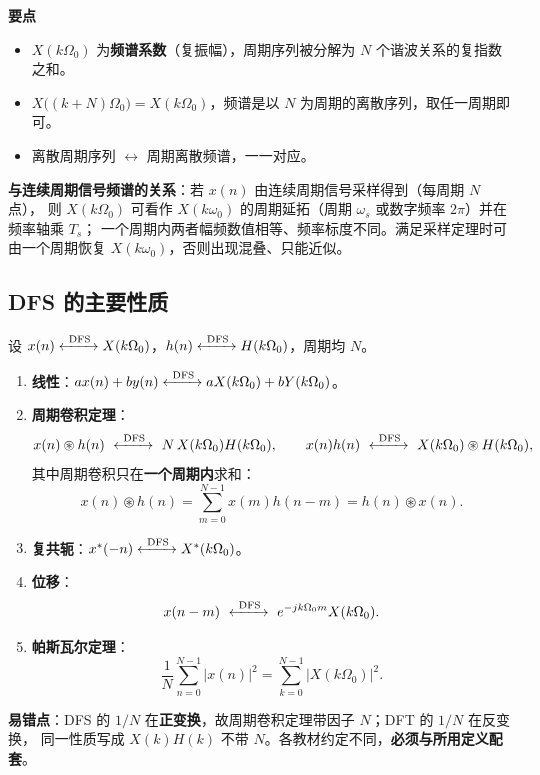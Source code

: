 \textbf{要点}
\begin{itemize}
\item $X(k\Omega_0)$ 为\textbf{频谱系数}（复振幅），周期序列被分解为 $N$ 个谐波关系的复指数之和。
\item $X\big((k+N)\Omega_0\big)=X(k\Omega_0)$，频谱是以 $N$ 为周期的离散序列，取任一周期即可。
\item 离散周期序列 $\leftrightarrow$ 周期离散频谱，一一对应。
\end{itemize}

\textbf{与连续周期信号频谱的关系}：若 $x(n)$ 由连续周期信号采样得到（每周期 $N$ 点），
则 $X(k\Omega_0)$ 可看作 $X(k\omega_0)$ 的周期延拓（周期 $\omega_s$ 或数字频率 $2\pi$）并在频率轴乘 $T_s$；
一个周期内两者幅频数值相等、频率标度不同。满足采样定理时可由一个周期恢复 $X(k\omega_0)$，否则出现混叠、只能近似。

\subsection{DFS 的主要性质}

设 $x(n)\xleftrightarrow{\ \mathrm{DFS}\ }X(k\Omega_0)$，$h(n)\xleftrightarrow{\ \mathrm{DFS}\ }H(k\Omega_0)$，周期均 $N$。

\begin{enumerate}
\item \textbf{线性}：$ax(n)+by(n)\xleftrightarrow{\ \mathrm{DFS}\ }aX(k\Omega_0)+bY(k\Omega_0)$。
\item \textbf{周期卷积定理}：
\begin{equation}
x(n)\circledast h(n)\ \xleftrightarrow{\ \mathrm{DFS}\ }\ N\,X(k\Omega_0)H(k\Omega_0),
\qquad
x(n)h(n)\ \xleftrightarrow{\ \mathrm{DFS}\ }\ X(k\Omega_0)\circledast H(k\Omega_0),
\end{equation}
其中周期卷积只在\textbf{一个周期内}求和：
\begin{equation}
x(n)\circledast h(n)=\sum_{m=0}^{N-1}x(m)h(n-m)=h(n)\circledast x(n).
\end{equation}
\item \textbf{复共轭}：$x^*(-n)\xleftrightarrow{\ \mathrm{DFS}\ }X^*(k\Omega_0)$。
\item \textbf{位移}：
\begin{equation}
x(n-m)\ \xleftrightarrow{\ \mathrm{DFS}\ }\ e^{-jk\Omega_0 m}X(k\Omega_0).
\end{equation}
\item \textbf{帕斯瓦尔定理}：
\begin{equation}
\frac{1}{N}\sum_{n=0}^{N-1}\big|x(n)\big|^2=\sum_{k=0}^{N-1}\big|X(k\Omega_0)\big|^2 .
\end{equation}
\end{enumerate}
\textbf{易错点}：DFS 的 $1/N$ 在\textbf{正变换}，故周期卷积定理带因子 $N$；DFT 的 $1/N$ 在反变换，
同一性质写成 $X(k)H(k)$ 不带 $N$。各教材约定不同，\textbf{必须与所用定义配套}。

